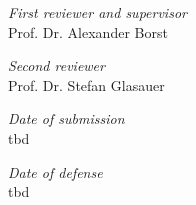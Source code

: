 \parindent0pt
\hfill

\vfill

\textit{First reviewer and supervisor} \\
Prof. Dr. Alexander Borst

\bigskip

\textit{Second reviewer} \\
Prof. Dr. Stefan Glasauer

\bigskip

\textit{Date of submission} \\
tbd

\bigskip

\textit{Date of defense} \\
tbd
